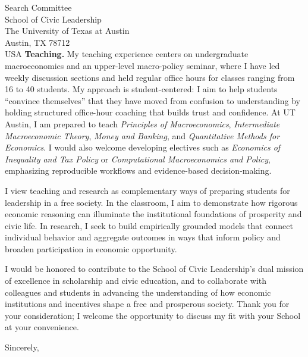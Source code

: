 \documentclass[11pt,letterpaper]{letter}
\begin{document}
\begin{letter}{Search Committee \\
School of Civic Leadership \\
The University of Texas at Austin \\
Austin, TX 78712 \\ USA}
\textbf{Teaching.} My teaching experience centers on undergraduate macroeconomics and an upper-level macro-policy seminar, where I have led weekly discussion sections and held regular office hours for classes ranging from 16 to 40 students. My approach is student-centered: I aim to help students “convince themselves” that they have moved from confusion to understanding by holding structured office-hour coaching that builds trust and confidence. At UT Austin, I am prepared to teach \textit{Principles of Macroeconomics}, \textit{Intermediate Macroeconomic Theory}, \textit{Money and Banking}, and \textit{Quantitative Methods for Economics}. I would also welcome developing electives such as \textit{Economics of Inequality and Tax Policy} or \textit{Computational Macroeconomics and Policy}, emphasizing reproducible workflows and evidence-based decision-making.

I view teaching and research as complementary ways of preparing students for leadership in a free society. In the classroom, I aim to demonstrate how rigorous economic reasoning can illuminate the institutional foundations of prosperity and civic life. In research, I seek to build empirically grounded models that connect individual behavior and aggregate outcomes in ways that inform policy and broaden participation in economic opportunity.

I would be honored to contribute to the School of Civic Leadership’s dual mission of excellence in scholarship and civic education, and to collaborate with colleagues and students in advancing the understanding of how economic institutions and incentives shape a free and prosperous society. Thank you for your consideration; I welcome the opportunity to discuss my fit with your School at your convenience.

\closing{Sincerely,}

\end{letter}
\end{document}
